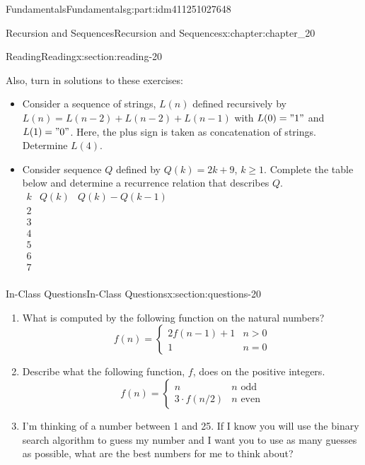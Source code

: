 \documentclass[oneside,10pt,]{book}
\numberwithin{equation}{section}
\newcommand{\gt}{>}
\begin{document}
\begin{partptx}{Fundamentals}{}{Fundamentals}{}{}{g:part:idm411251027648}
\begin{chapterptx}{Recursion and Sequences}{}{Recursion and Sequences}{}{}{x:chapter:chapter_20}
\begin{sectionptx}{Reading}{}{Reading}{}{}{x:section:reading-20}
\par
Also, turn in solutions to these exercises:%
\begin{itemize}[label=\textbullet]
\item{}Consider a sequence of strings, \(L(n)\) defined recursively by \(L(n)=L(n-2)+L(n-2)+L(n-1)\) with \(L(0)="1"\) and \(L(1)="0"\). Here, the plus sign is taken as concatenation of strings.  Determine \(L(4)\).%
\item{}Consider sequence \(Q\) defined by \(Q(k) = 2k + 9\), \(k \geq  1\). Complete the table below and determine a recurrence relation that describes \(Q\). \(\begin{array}{c|c|c}
k & Q(k)  & Q(k)-Q(k-1) \\
\hline
2 &   &   \\
3 &   &   \\
4 & \text{  } &   \\
5 &   &   \\
6 &   &   \\
7 &   &   \\
\end{array}\)%
\end{itemize}
%
\end{sectionptx}
%
%
\typeout{************************************************}
\typeout{************************************************}
%
\begin{sectionptx}{In-Class Questions}{}{In-Class Questions}{}{}{x:section:questions-20}
%
\begin{enumerate}[label=\arabic*.]
\item{}What is computed by the following function on the natural numbers?%
\begin{equation*}
f(n)=\begin{cases} 
2 f(n-1)+1 & n \gt 0 \\
1			 & n=0
\end{cases}
\end{equation*}
%
\item{}Describe what the following function, \(f\), does on the positive integers.%
\begin{equation*}
f(n)=\begin{cases} 
n & n\textrm{ odd} \\
3\cdot f(n/2) & n\textrm{ even}
\end{cases}
\end{equation*}
%
\item{}I'm thinking of a number between 1 and 25.  If I know you will use the binary search algorithm to guess my number and I want you to use as many guesses as possible, what are the best numbers for me to think about?%

\end{enumerate}
\end{sectionptx}
\end{chapterptx}
\end{partptx}
\end{document}
